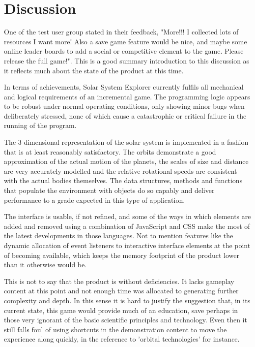 \documentclass[twoside]{bhamthesis}
\begin{document}
\section{Discussion}

One of the test user group stated in their feedback, "More!!! I collected lots of resources I want more! Also a save game feature would be nice, and maybe some online leader boards to add a social or competitive element to the game. Please release the full game!".  This is a good summary introduction to this discussion as it reflects much about the state of the product at this time.

In terms of achievements, Solar System Explorer currently fulfils all mechanical and logical requirements of an incremental game. The programming logic appears to be robust under normal operating conditions, only showing minor bugs when deliberately stressed, none of which cause a catastrophic or critical failure in the running of the program.

The 3-dimensional representation of the solar system is implemented in a fashion that is at least reasonably satisfactory. The orbits demonstrate a good approximation of the actual motion of the planets,  the scales of size and distance are very accurately modelled and the relative rotational speeds are consistent with the actual bodies themselves. The data structures, methods and functions that populate the environment with objects do so capably and deliver performance to a grade expected in this type of application.

The interface is usable, if not refined, and some of the ways in which elements are added and removed using a combination of JavaScript and CSS make the most of the latest developments in those languages. Not to mention features like the dynamic allocation of event listeners to interactive interface elements at the point of becoming available, which keeps the memory footprint of the product lower than it otherwise would be.

This is not to say that the product is without deficiencies. It lacks gameplay content at this point and not enough time was allocated to generating further complexity and depth. In this sense it is hard to justify the suggestion that, in its current state, this game would provide much of an education, save perhaps in those very ignorant of the basic scientific principles and technology. Even then it still falls foul of using shortcuts in the demonstration content to move the experience along quickly, in the reference to 'orbital technologies' for instance.
\end{document}
